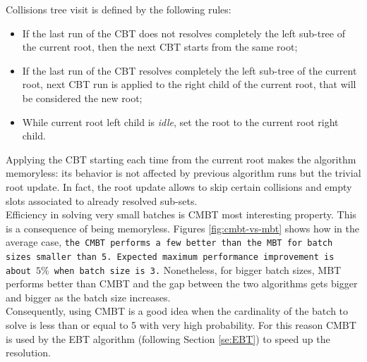 \documentclass[11pt,a4paper,twoside,openright]{book}
\newcommand{\revv}[1]{{\tt#1}}
\begin{document}
\noindent Collisions tree visit is defined by the following rules: 
\begin{itemize}
\item If the last  run of the CBT does not resolves completely the left sub-tree of the current root, then the next CBT starts from the same root;
\item If the last run of the CBT resolves completely the left sub-tree of the current root, next CBT run is applied to the right child of the current root, that will be considered the new root;
\item While current root left child is \emph{idle}, set the root to the current root right child.
\end{itemize}
Applying the CBT starting each time from the current root makes the algorithm memoryless: its behavior is not affected by previous algorithm runs but the trivial root update. In fact, the root update allows to skip certain collisions and empty slots associated to already resolved sub-sets.\\ 

Efficiency in solving very small batches is CMBT most interesting property. This is a consequence of being memoryless. 
Figures \ref{fig:cmbt-vs-mbt} shows how in the average case, \revv{the CMBT performs a few better than the MBT  for batch sizes smaller than 5. Expected maximum performance improvement is about $5\%$ when batch size is 3.} Nonetheless, for bigger batch sizes, MBT performs better than CMBT and  the gap between the two algorithms gets bigger and bigger as the batch size increases.\\

Consequently, using CMBT is a good idea when the cardinality of the batch to solve is less than or equal to 5 with very high probability. For this reason CMBT is used by the EBT algorithm (following Section \ref{se:EBT}) to speed up the resolution.
  
\end{document}
